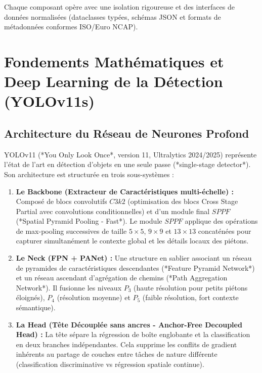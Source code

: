 \documentclass[11pt,a4paper]{article}
\begin{document}
Chaque composant opère avec une isolation rigoureuse et des interfaces de données normalisées (dataclasses typées, schémas JSON et formats de métadonnées conformes ISO/Euro NCAP).

\section{Fondements Mathématiques et Deep Learning de la Détection (YOLOv11s)}

\subsection{Architecture du Réseau de Neurones Profond}
YOLOv11 (*You Only Look Once*, version 11, Ultralytics 2024/2025) représente l'état de l'art en détection d'objets en une seule passe (*single-stage detector*). Son architecture est structurée en trois sous-systèmes :

\begin{enumerate}
    \item \textbf{Le Backbone (Extracteur de Caractéristiques multi-échelle) :}
    Composé de blocs convolutifs $C3k2$ (optimisation des blocs Cross Stage Partial avec convolutions conditionnelles) et d'un module final $SPPF$ (*Spatial Pyramid Pooling - Fast*). Le module $SPPF$ applique des opérations de max-pooling successives de taille $5\times 5$, $9\times 9$ et $13\times 13$ concaténées pour capturer simultanément le contexte global et les détails locaux des piétons.
    
    \item \textbf{Le Neck (FPN + PANet) :}
    Une structure en sablier associant un réseau de pyramides de caractéristiques descendantes (*Feature Pyramid Network*) et un réseau ascendant d'agrégation de chemins (*Path Aggregation Network*). Il fusionne les niveaux $P_3$ (haute résolution pour petits piétons éloignés), $P_4$ (résolution moyenne) et $P_5$ (faible résolution, fort contexte sémantique).
    
    \item \textbf{La Head (Tête Découplée sans ancres - Anchor-Free Decoupled Head) :}
    La tête sépare la régression de boîte englobante et la classification en deux branches indépendantes. Cela supprime les conflits de gradient inhérents au partage de couches entre tâches de nature différente (classification discriminative vs régression spatiale continue).
\end{enumerate}
\end{document}
